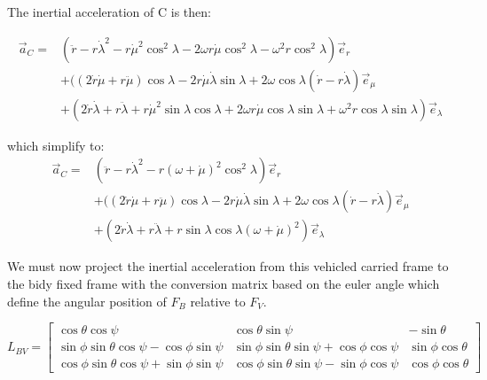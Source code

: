 \documentclass[10pt]{article}
\newcommand{\er}{\vec{e}_r}
\newcommand{\el}{\vec{e}_\lambda}
\newcommand{\eu}{\vec{e}_\mu}
\begin{document}
The inertial acceleration of C is then:

\begin{align*}
\vec{a}_C = &   (\ddot{r} - r\dot{\lambda}^2 -
                r\dot{\mu}^2\cos^2{\lambda} - 2\omega
                r\dot{\mu}\cos^2{\lambda} - \omega^2r\cos^2{\lambda})\er\\ 
            & + ((2\dot{r}\dot{\mu} + r\ddot{\mu})\cos{\lambda} -
                2r\dot{\mu}\dot{\lambda}\sin{\lambda}
              + 2\omega\cos{\lambda}(\dot{r}-r\dot{\lambda})\eu\\
            & + (2\dot{r}\dot{\lambda} + r\ddot{\lambda} +
                r\dot{\mu}^2\sin{\lambda}\cos{\lambda} +2\omega
                r\dot{\mu}\cos{\lambda}\sin{\lambda} +
                \omega^2r\cos{\lambda}\sin{\lambda})\el
\end{align*}

which simplify to:
\begin{align*}
\vec{a}_C = &   (\ddot{r} - r\dot{\lambda}^2 -
	        r(\omega+\dot{\mu})^2\cos^2{\lambda})\er\\ 
            & + ((2\dot{r}\dot{\mu} + r\ddot{\mu})\cos{\lambda} -
                2r\dot{\mu}\dot{\lambda}\sin{\lambda}
              + 2\omega\cos{\lambda}(\dot{r}-r\dot{\lambda})\eu\\
            & + (2\dot{r}\dot{\lambda} + r\ddot{\lambda} +
	        r\sin{\lambda}\cos{\lambda}(\omega+\dot{\mu})^2)\el
\end{align*}


We must now project the inertial acceleration from this vehicled
carried frame to the bidy fixed frame with the conversion matrix based
on the euler angle which define the angular position of $F_B$ relative
to $F_V$.

$$L_{BV} = \begin{bmatrix} \cos{\theta}\cos{\psi}&
                         \cos{\theta}\sin{\psi}& -\sin{\theta}\\
                         \sin{\phi}\sin{\theta}\cos{\psi}-\cos{\phi}\sin{\psi}&
                         \sin{\phi}\sin{\theta}\sin{\psi}+\cos{\phi}\cos{\psi}&
                         \sin{\phi}\cos{\theta}\\
                         \cos{\phi}\sin{\theta}\cos{\psi}+\sin{\phi}\sin{\psi}&
                         \cos{\phi}\sin{\theta}\sin{\psi}-\sin{\phi}\cos{\psi}&
                         \cos{\phi}\cos{\theta}
         \end{bmatrix}
$$
\end{document}
